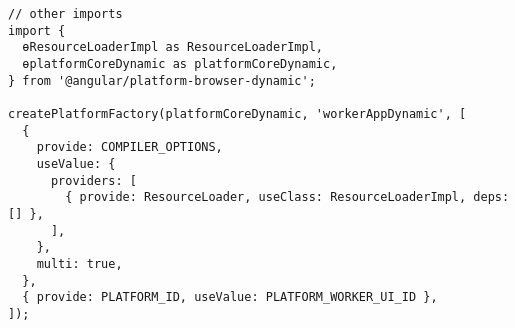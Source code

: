 \begin{verbatim}
// other imports
import {
  ɵResourceLoaderImpl as ResourceLoaderImpl,
  ɵplatformCoreDynamic as platformCoreDynamic,
} from '@angular/platform-browser-dynamic';

createPlatformFactory(platformCoreDynamic, 'workerAppDynamic', [
  {
    provide: COMPILER_OPTIONS,
    useValue: {
      providers: [
        { provide: ResourceLoader, useClass: ResourceLoaderImpl, deps: [] },
      ],
    },
    multi: true,
  },
  { provide: PLATFORM_ID, useValue: PLATFORM_WORKER_UI_ID },
]);
\end{verbatim}

